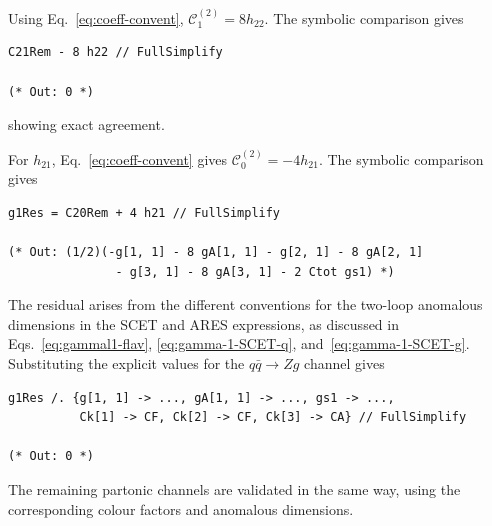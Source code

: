 Using Eq.~\eqref{eq:coeff-convent}, $\mathcal{C}^{(2)}_1=8h_{22}$.
The symbolic comparison gives
\begin{lstlisting}[style=mma, caption={Symbolic comparison of $h_{22}$ with
$\mathcal{C}^{(2)}_1$.}]
C21Rem - 8 h22 // FullSimplify

(* Out: 0 *)
\end{lstlisting}
showing exact agreement.

For $h_{21}$, Eq.~\eqref{eq:coeff-convent} gives
$\mathcal{C}^{(2)}_0=-4h_{21}$. The symbolic comparison gives
\begin{lstlisting}[style=mma, caption={Symbolic comparison of $h_{21}$ with
$\mathcal{C}^{(2)}_0$.}]
g1Res = C20Rem + 4 h21 // FullSimplify

(* Out: (1/2)(-g[1, 1] - 8 gA[1, 1] - g[2, 1] - 8 gA[2, 1]
               - g[3, 1] - 8 gA[3, 1] - 2 Ctot gs1) *)
\end{lstlisting}

The residual arises from the different conventions for the two-loop
anomalous dimensions in the SCET and \textsc{ARES} expressions, as
discussed in Eqs.~\eqref{eq:gammal1-flav},
\eqref{eq:gamma-1-SCET-q}, and~\eqref{eq:gamma-1-SCET-g}. Substituting
the explicit values for the $q\bar q\to Zg$ channel gives
\begin{lstlisting}[style=mma, caption={Evaluation of the residual for the
$q\bar q\to Zg$ channel.}]
g1Res /. {g[1, 1] -> ..., gA[1, 1] -> ..., gs1 -> ...,
          Ck[1] -> CF, Ck[2] -> CF, Ck[3] -> CA} // FullSimplify

(* Out: 0 *)
\end{lstlisting}

The remaining partonic channels are validated in the same way, using the
corresponding colour factors and anomalous dimensions.